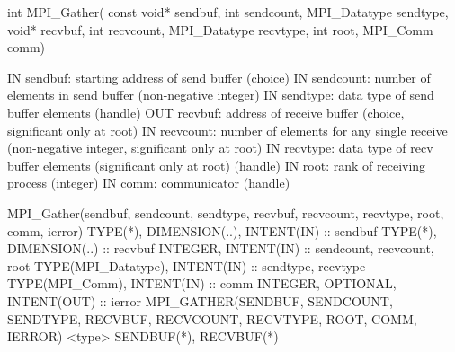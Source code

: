 int MPI_Gather(
  const void* sendbuf, int sendcount, MPI_Datatype sendtype,
  void* recvbuf, int recvcount, MPI_Datatype recvtype,
  int root, MPI_Comm comm)

IN sendbuf: starting address of send buffer (choice)
IN sendcount: number of elements in send buffer (non-negative integer)
IN sendtype: data type of send buffer elements (handle)
OUT recvbuf: address of receive buffer (choice, significant only at root)
IN recvcount: number of elements for any single receive (non-negative integer, significant only at root)
IN recvtype: data type of recv buffer elements (significant only at root) (handle)
IN root: rank of receiving process (integer)
IN comm: communicator (handle)

MPI_Gather(sendbuf, sendcount, sendtype, recvbuf, recvcount, recvtype, root, comm, ierror)
TYPE(*), DIMENSION(..), INTENT(IN) :: sendbuf
TYPE(*), DIMENSION(..) :: recvbuf
INTEGER, INTENT(IN) :: sendcount, recvcount, root
TYPE(MPI_Datatype), INTENT(IN) :: sendtype, recvtype
TYPE(MPI_Comm), INTENT(IN) :: comm
INTEGER, OPTIONAL, INTENT(OUT) :: ierror
MPI_GATHER(SENDBUF, SENDCOUNT, SENDTYPE, RECVBUF, RECVCOUNT, RECVTYPE, ROOT, COMM, IERROR)
<type> SENDBUF(*), RECVBUF(*)
